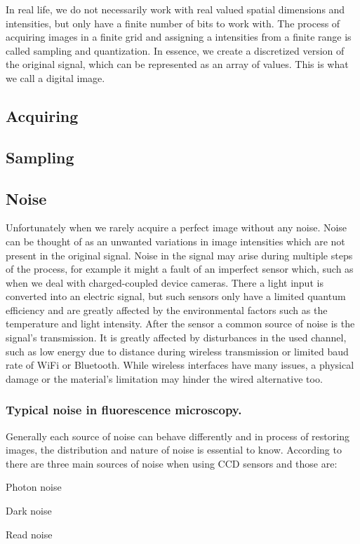 \documentclass[
  digital,     %
  oneside,     %
  nosansbold,  %
  nocolorbold, %
  lof,         %
  lot,         %
]{fithesis4}
\begin{document}
In real life, we do not necessarily work with real valued spatial dimensions and
intensities, but only have a finite number of bits to work with. The process of
acquiring images in a finite grid and assigning a intensities from a finite
range is called sampling and quantization. In essence, we create a discretized
version of the original signal, which can be represented as an array of values.
This is what we call a digital image.

\subsection{Acquiring}

\subsection{Sampling}

\subsection{Noise}

Unfortunately when we rarely acquire a perfect image without any noise. Noise
can be thought of as an unwanted variations in image intensities which are not
present in the original signal. Noise in the signal may arise during multiple
steps of the process, for example it might a fault of an imperfect sensor which,
such as when we deal with charged-coupled device cameras. There a light input is
converted into an electric signal, but such sensors only have a limited quantum
efficiency and are greatly affected by the environmental factors such as the
temperature and light intensity. After the sensor a common source of noise is
the signal's transmission. It is greatly affected by disturbances in the used
channel, such as low energy due to distance during wireless transmission or
limited baud rate of WiFi or Bluetooth. While wireless interfaces have many
issues, a physical damage or the material's limitation may hinder the wired
alternative too.

\subsubsection{Typical noise in fluorescence microscopy.}

Generally each source of noise can behave differently and in process of restoring
images, the distribution and nature of noise is essential to know. According to
\parencite{hamamatsu_ccd} there are three main sources of noise when using CCD
sensors and those are:
\begin{compactenum}
\item Photon noise
\item Dark noise
\item Read noise
\end{compactenum}
\end{document}
